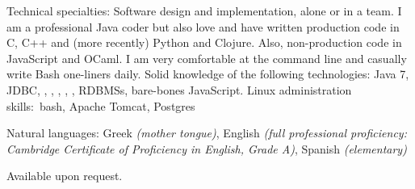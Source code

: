\documentclass[10pt,a4paper]{article} %
\begin{document}


\inlineheadsection %
{Technical specialties:}
{Software design and implementation, alone or in a team. I am a professional Java coder but also love
  and have written production code in C, C++ and (more recently) Python and Clojure.
  Also, non-production code in JavaScript and OCaml. I am very comfortable
  at the command line and casually write Bash one-liners daily.
 Solid knowledge of the following technologies: Java 7, JDBC, , , , , , RDBMSs,
  bare-bones JavaScript.
  Linux administration skills:\ bash, Apache Tomcat,
  Postgres}

\inlineheadsection{}{}

\inlineheadsection %
{Natural languages:}
{Greek \textit{(mother tongue)}, English \textit{(full professional proficiency: Cambridge Certificate of Proficiency in English, Grade A)}, Spanish \textit{(elementary)}}

\spacedhrule{1.6em}{-0.4em} %


Available upon request.
\iffalse
  \inlineheadsection
      {\href{mailto:Christophe.Arviset@esa.int}{Christophe ARVISET}}
      {Head of the \href{http://www.cosmos.esa.int/web/esdc}{Science Archives Unit}, \href{http://www.esa.int/About\_Us/ESACESAC}{ESAC}}

      \inlineheadsection{}{}

  \inlineheadsection
      {\href{mailto:i_koufoudakis@c-gaia.gr}{Yannis KOUFOUDAKIS}}
      {Managing Director, \href{https://www.c-gaia.gr/}{GAIA}.
        \\ GAIA is a 50 MEuro turnover company running the informational systems handling
        practically all EU-agricultural subsidies in Greece.}
\fi
\spacedhrule{1.6em}{-0.4em} %
\end{document}

